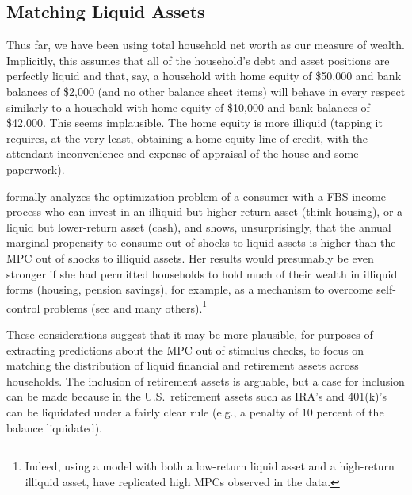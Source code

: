 \documentclass[12pt,titlepage]{econtex}
\begin{document}
\subsection{Matching Liquid Assets}
Thus far, we have been using total household net worth as our measure
of wealth.  Implicitly, this assumes that all of the household's debt
and asset positions are perfectly liquid and that, say, a household
with home equity of \$50,000 and bank balances of \$2,000 (and no
other balance sheet items) will behave in every respect similarly to a
household with home equity of \$10,000 and bank balances of \$42,000.
This seems implausible.  The home equity is more illiquid (tapping it
requires, at the very least, obtaining a home equity line of credit,
with the attendant inconvenience and expense of appraisal of the house
and some paperwork).

\citet{otsukaIlliquid} formally analyzes the optimization problem of
a consumer with a FBS income process who can invest in an illiquid but
higher-return asset (think housing), or a liquid but lower-return
asset (cash), and shows, unsurprisingly, that the annual marginal propensity
to consume out of shocks to liquid assets is higher than the MPC out
of shocks to illiquid assets.  Her results would presumably be even
stronger if she had permitted households to hold much of their wealth in illiquid forms (housing,
pension savings), for example, as a mechanism to overcome self-control problems
(see \citet{laibson:goldeneggs} and many others).\footnote{Indeed, using a model with both a low-return liquid asset and a high-return illiquid asset, \citet{kvStim} have replicated high MPCs observed in the data.}  %

These considerations suggest that it may be more plausible, for
purposes of extracting predictions about the MPC out of stimulus
checks, to focus on matching the distribution of liquid financial and retirement assets across households. The inclusion of retirement assets is arguable, %
but a case for inclusion can be made because in the U.S.\ retirement assets such as IRA's and 401(k)'s can be liquidated under a fairly clear rule (e.g., a penalty of $10$ percent of the balance liquidated).
\end{document}
